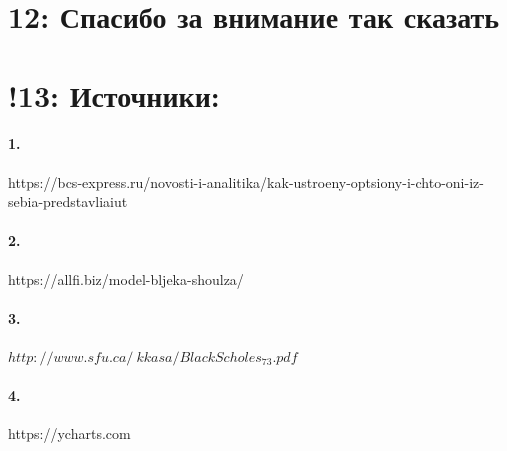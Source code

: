 \documentclass[a4paper]{article}
\begin{document}
\section*{12: Спасибо за внимание так сказать}
\section*{!13: Источники:}
\paragraph*{1.}
https://bcs-express.ru/novosti-i-analitika/kak-ustroeny-optsiony-i-chto-oni-iz-sebia-predstavliaiut
\paragraph*{2.}
https://allfi.biz/model-bljeka-shoulza/
\paragraph*{3.}
$http://www.sfu.ca/~kkasa/BlackScholes_73.pdf$
\paragraph*{4.}
https://ycharts.com
\end{document}
